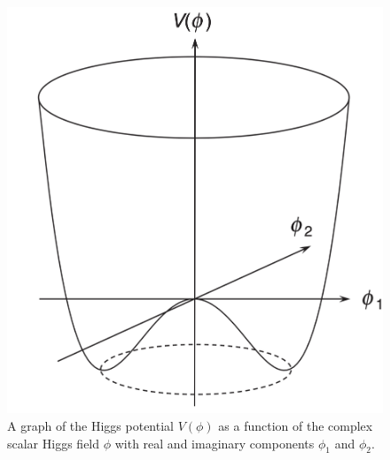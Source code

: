 \begin{figure}[H]
    \centering
    \includegraphics[width=.5\textwidth]{Images/Theory/HiggsPotential.png}
    \caption{A graph of the Higgs potential $V(\phi)$ as a function of the complex scalar Higgs field $\phi$ with real and imaginary components $\phi_1$ and $\phi_2$.}
    \label{fig:HiggsPotential}
\end{figure}
